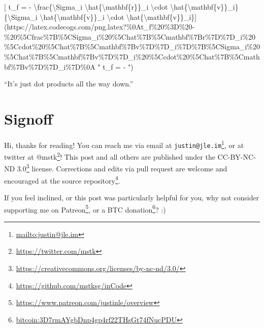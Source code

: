 \documentclass[]{article}
\renewcommand{\href}[2]{#2\footnote{\url{#1}}}
\begin{document}
{[} t\_f = - \textbackslash{}frac\{\textbackslash{}Sigma\_i
\textbackslash{}hat\{\textbackslash{}mathbf\{r\}\}\_i \textbackslash{}cdot
\textbackslash{}hat\{\textbackslash{}mathbf\{v\}\}\_i\}\{\textbackslash{}Sigma\_i
\textbackslash{}hat\{\textbackslash{}mathbf\{v\}\}\_i \textbackslash{}cdot
\textbackslash{}hat\{\textbackslash{}mathbf\{v\}\}\_i\}{]}(https://latex.codecogs.com/png.latex?\%0At\_f\%20\%3D\%20-\%20\%5Cfrac\%7B\%5CSigma\_i\%20\%5Chat\%7B\%5Cmathbf\%7Br\%7D\%7D\_i\%20\%5Ccdot\%20\%5Chat\%7B\%5Cmathbf\%7Bv\%7D\%7D\_i\%7D\%7B\%5CSigma\_i\%20\%5Chat\%7B\%5Cmathbf\%7Bv\%7D\%7D\_i\%20\%5Ccdot\%20\%5Chat\%7B\%5Cmathbf\%7Bv\%7D\%7D\_i\%7D\%0A
" t\_f = -
")

``It's just dot products all the way down.''

\hypertarget{signoff}{%
\section{Signoff}\label{signoff}}

Hi, thanks for reading! You can reach me via email at
\href{mailto:justin@jle.im}{\nolinkurl{justin@jle.im}}, or at twitter at
\href{https://twitter.com/mstk}{@mstk}! This post and all others are published
under the \href{https://creativecommons.org/licenses/by-nc-nd/3.0/}{CC-BY-NC-ND
3.0} license. Corrections and edits via pull request are welcome and encouraged
at \href{https://github.com/mstksg/inCode}{the source repository}.

If you feel inclined, or this post was particularly helpful for you, why not
consider \href{https://www.patreon.com/justinle/overview}{supporting me on
Patreon}, or a \href{bitcoin:3D7rmAYgbDnp4gp4rf22THsGt74fNucPDU}{BTC donation}?
:)
\end{document}
